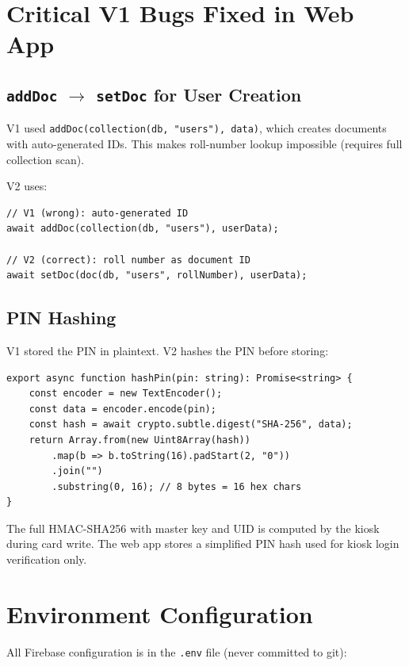 \section{Critical V1 Bugs Fixed in Web App}

\subsection{\texttt{addDoc} $\rightarrow$ \texttt{setDoc} for User Creation}

V1 used \texttt{addDoc(collection(db, "users"), data)}, which creates documents with auto-generated IDs. This makes roll-number lookup impossible (requires full collection scan).

V2 uses:
\begin{lstlisting}[language={[Sharp]C},caption={User creation fix in src/lib/firebase.ts}]
// V1 (wrong): auto-generated ID
await addDoc(collection(db, "users"), userData);

// V2 (correct): roll number as document ID
await setDoc(doc(db, "users", rollNumber), userData);
\end{lstlisting}

\subsection{PIN Hashing}

V1 stored the PIN in plaintext. V2 hashes the PIN before storing:

\begin{lstlisting}[language={[Sharp]C},caption={PIN hashing in src/lib/firebase.ts}]
export async function hashPin(pin: string): Promise<string> {
    const encoder = new TextEncoder();
    const data = encoder.encode(pin);
    const hash = await crypto.subtle.digest("SHA-256", data);
    return Array.from(new Uint8Array(hash))
        .map(b => b.toString(16).padStart(2, "0"))
        .join("")
        .substring(0, 16); // 8 bytes = 16 hex chars
}
\end{lstlisting}

The full HMAC-SHA256 with master key and UID is computed by the kiosk during card write. The web app stores a simplified PIN hash used for kiosk login verification only.

\section{Environment Configuration}

All Firebase configuration is in the \texttt{.env} file (never committed to git):

